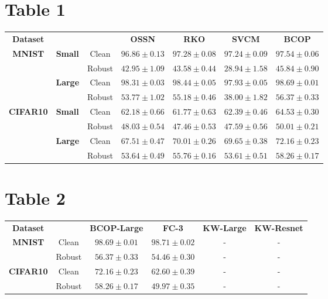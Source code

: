 \documentclass{article}%
\begin{document}
%
\normalsize%
\section*{Table 1}%
\label{sec:Table1}%
\begin{tabularx}{\textwidth}{c|cc|cccc}%
\textbf{Dataset}&\textbf{}&\textbf{}&\textbf{OSSN}&\textbf{RKO}&\textbf{SVCM}&\textbf{BCOP}\\%
\cmidrule{1-7}%
\multirow{4}{*}{\textbf{{MNIST}}}&\multirow{2}{*}{\textbf{Small}}&Clean&$96.86\pm0.13$&$97.28\pm0.08$&$97.24\pm0.09$&$\mathbf{97.54}\pm0.06$\\%
&&Robust&$42.95\pm1.09$&$43.58\pm0.44$&$28.94\pm1.58$&$\mathbf{45.84}\pm0.90$\\%
\cmidrule{2-7}%
&\multirow{2}{*}{\textbf{Large}}&Clean&$98.31\pm0.03$&$98.44\pm0.05$&$97.93\pm0.05$&$\mathbf{98.69}\pm0.01$\\%
&&Robust&$53.77\pm1.02$&$55.18\pm0.46$&$38.00\pm1.82$&$\mathbf{56.37}\pm0.33$\\%
\cmidrule{1-7}%
\multirow{4}{*}{\textbf{{CIFAR10}}}&\multirow{2}{*}{\textbf{Small}}&Clean&$62.18\pm0.66$&$61.77\pm0.63$&$62.39\pm0.46$&$\mathbf{64.53}\pm0.30$\\%
&&Robust&$48.03\pm0.54$&$47.46\pm0.53$&$47.59\pm0.56$&$\mathbf{50.01}\pm0.21$\\%
\cmidrule{2-7}%
&\multirow{2}{*}{\textbf{Large}}&Clean&$67.51\pm0.47$&$70.01\pm0.26$&$69.65\pm0.38$&$\mathbf{72.16}\pm0.23$\\%
&&Robust&$53.64\pm0.49$&$55.76\pm0.16$&$53.61\pm0.51$&$\mathbf{58.26}\pm0.17$\\%
\cmidrule{1-7}%
\end{tabularx}

%
\section*{Table 2}%
\label{sec:Table2}%
\begin{tabularx}{\textwidth}{c|c|cccc}%
\textbf{Dataset}&&\textbf{BCOP-Large}&\textbf{FC-3}&\textbf{KW-Large }&\textbf{KW-Resnet}\\%
\cmidrule{1-6}%
\multirow{2}{*}{\textbf{{MNIST}}}&Clean&$98.69\pm0.01$&$\mathbf{98.71}\pm0.02$&{-}&{-}\\%
&Robust&$\mathbf{56.37}\pm0.33$&$54.46\pm0.30$&{-}&{-}\\%
\cmidrule{1-6}%
\multirow{2}{*}{\textbf{{CIFAR10}}}&Clean&$\mathbf{72.16}\pm0.23$&$62.60\pm0.39$&{-}&{-}\\%
&Robust&$\mathbf{58.26}\pm0.17$&$49.97\pm0.35$&{-}&{-}\\%
\cmidrule{1-6}%
\end{tabularx}
\end{document}
